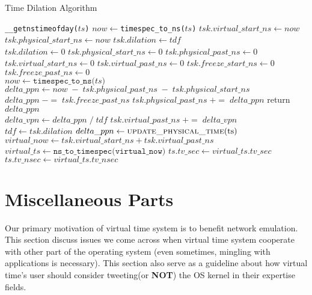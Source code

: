 \documentclass{acm_proc_article-sp}
\begin{document}
\begin{algorithm*}[t]
\caption{Time Dilation Algorithm}%
\label{Alg-DilateTimeKeeping}
\begin{algorithmic}[1]
    \State \texttt{\_\_getnstimeofday($ts$)}
    \State $now \gets $\texttt{timespec\_to\_ns($ts$)}
    \State $tsk.virtual\_start\_ns \gets now $
    \State $tsk.physical\_start\_ns \gets now $
    \State $tsk.dilation \gets tdf$
\EndIf
\EndFunction
\\
\State $tsk.dilation \gets 0$
\State $tsk.physical\_start\_ns \gets 0$
\State $tsk.physical\_past\_ns \gets 0$
\State $tsk.virtual\_start\_ns \gets 0$
\State $tsk.virtual\_past\_ns \gets 0$
\State $tsk.freeze\_start\_ns \gets 0$
\State $tsk.freeze\_past\_ns \gets 0$
\EndFunction
\\
\State $now \gets \texttt{timespec\_to\_ns($ts$)}$
\State $delta\_ppn \gets now \; - \; tsk.physical\_past\_ns \; - \; tsk.physical\_start\_ns$
\State $delta\_ppn \; -= \; tsk.freeze\_past\_ns$
\State $tsk.physical\_past\_ns \; += \; delta\_ppn$
\State return $delta\_ppn$
\EndFunction
\\
	\State $delta\_vpn \gets delta\_ppn \; / \; tdf$
	\State $tsk.virtual\_past\_ns \; += \; delta\_vpn$
\EndIf
\EndFunction
\\
\State $tdf \gets tsk.dilation$
	\State $delta\_ppn \gets \Call{update\_physical\_time}{$ts$}$
	\State {}
	\State $virtual\_now \gets tsk.virtual\_start\_ns + tsk.virtual\_past\_ns$
	\State $virtual\_ts \gets \texttt{ns\_to\_timespec(virtual\_now)}$
	\State $ts.tv\_sec \gets virtual\_ts.tv\_sec$
	\State $ts.tv\_nsec \gets virtual\_ts.tv\_nsec$
\EndIf
\EndFunction
\end{algorithmic}
\end{algorithm*}

\section{Miscellaneous Parts}
Our primary motivation of virtual time system is to benefit network emulation. 
This section discuss issues we come across when virtual time system cooperate with other part of the operating system 
(even sometimes, mingling with applications is necessary). 
This section also serve as a guideline about how virtual time's user should consider tweeting(or \textbf{NOT}) the OS kernel in their expertise fields. 
\end{document}

